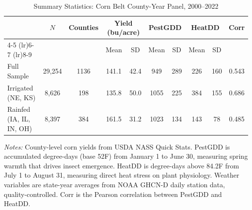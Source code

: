 \begin{table}[htbp]
\centering
\begin{threeparttable}
\caption{Summary Statistics: Corn Belt County-Year Panel, 2000--2022}
\label{tab:summary}
\footnotesize
\begin{tabular}{lccccccccc}
\toprule
 & $N$ & Counties & \multicolumn{2}{c}{Yield (bu/acre)} & \multicolumn{2}{c}{PestGDD} & \multicolumn{2}{c}{HeatDD} & Corr \\
\cmidrule(lr){4-5} \cmidrule(lr){6-7} \cmidrule(lr){8-9}
 & & & Mean & SD & Mean & SD & Mean & SD & \\
\midrule
Full Sample & 29,254 & 1136 & 141.1 & 42.4 & 949 & 289 & 226 & 160 & 0.543 \\
Irrigated (NE, KS) & 8,626 & 198 & 135.8 & 50.0 & 1055 & 225 & 384 & 155 & 0.686 \\
Rainfed (IA, IL, IN, OH) & 8,397 & 384 & 161.5 & 31.2 & 1023 & 134 & 143 & 78 & 0.485 \\
\bottomrule
\end{tabular}
\begin{tablenotes}[flushleft]
\footnotesize
\item \textit{Notes:} County-level corn yields from USDA NASS Quick Stats. PestGDD is accumulated degree-days (base 52\textdegree{}F) from January 1 to June 30, measuring spring warmth that drives insect emergence. HeatDD is degree-days above 84.2\textdegree{}F from July 1 to August 31, measuring direct heat stress on plant physiology. Weather variables are state-year averages from NOAA GHCN-D daily station data, quality-controlled. Corr is the Pearson correlation between PestGDD and HeatDD.
\end{tablenotes}
\end{threeparttable}
\end{table}
